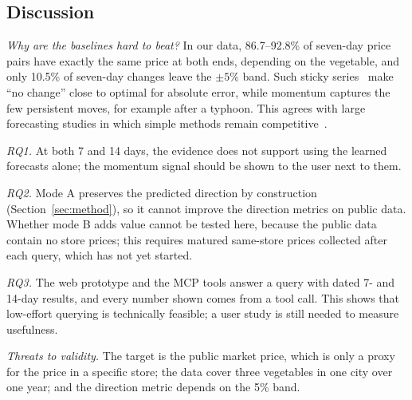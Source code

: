 

\subsection{Discussion}
\textit{Why are the baselines hard to beat?} In our data, 86.7--92.8\% of
seven-day price pairs have exactly the same price at both ends, depending on
the vegetable, and only 10.5\% of seven-day changes leave the $\pm5\%$ band.
Such sticky series~\cite{nakamura2008five,bils2004some} make ``no change''
close to optimal for absolute error, while momentum captures the few
persistent moves, for example after a typhoon. This agrees with large
forecasting studies in which simple methods remain
competitive~\cite{makridakis2020m4,zeng2023transformers}.

\textit{RQ1.} At both 7 and 14 days, the evidence does not support using the
learned forecasts alone; the momentum signal should be shown to the user next
to them.

\textit{RQ2.} Mode A preserves the predicted direction by construction
(Section~\ref{sec:method}), so it cannot improve the direction metrics on
public data. Whether mode B adds value cannot be tested here, because the
public data contain no store prices; this requires matured same-store prices
collected after each query, which has not yet started.

\textit{RQ3.} The web prototype and the MCP tools answer a query with dated
7- and 14-day results, and every number shown comes from a tool call. This
shows that low-effort querying is technically feasible; a user study is still
needed to measure usefulness.

\textit{Threats to validity.} The target is the public market price, which is
only a proxy for the price in a specific store; the data cover three
vegetables in one city over one year; and the direction metric depends on the
5\% band.
